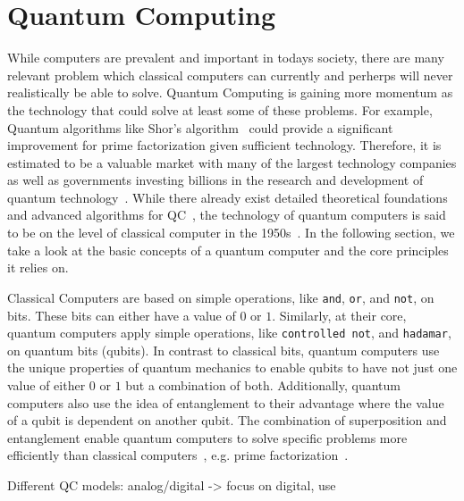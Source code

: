 \section{Quantum Computing}
While computers are prevalent and important in todays society, there are many relevant problem which classical computers can currently and perherps will never realistically be able to solve. Quantum Computing is gaining more momentum as the technology that could solve at least some of these problems. For example, Quantum algorithms like Shor's algorithm~\cite{Shor97} could provide a significant improvement for prime factorization given sufficient technology. Therefore, it is estimated to be a valuable market with many of the largest technology companies as well as governments investing billions in the research and development of quantum technology~\cite{RDB*22}. While there already exist detailed theoretical foundations~\cite{van20, Ying11,YYF12} and advanced algorithms for QC~\cite{ACR*10,BGB*18,LoCh19,Shor97}, the technology of quantum computers is said to be on the level of classical computer in the 1950s~\cite{CFM17}. In the following section, we take a look at the basic concepts of a quantum computer and the core principles it relies on.

Classical Computers are based on simple operations, like \texttt{and}, \texttt{or}, and \texttt{not}, on bits. These bits can either have a value of $0$ or $1$. Similarly, at their core, quantum computers apply simple operations, like \texttt{controlled not}, and \texttt{hadamar}, on quantum bits (qubits). In contrast to classical bits, quantum computers use the unique properties of quantum mechanics to enable qubits to have not just one value of either $0$ or $1$ but a combination of both. Additionally, quantum computers also use the idea of entanglement to their advantage where the value of a qubit is dependent on another qubit. The combination of superposition and entanglement enable quantum computers to solve specific problems more efficiently than classical computers~\cite{RDB*22}, e.g. prime factorization~\cite{Shor97}.

Different QC models: analog/digital -> focus on digital, use~\cite{DiCh20}

